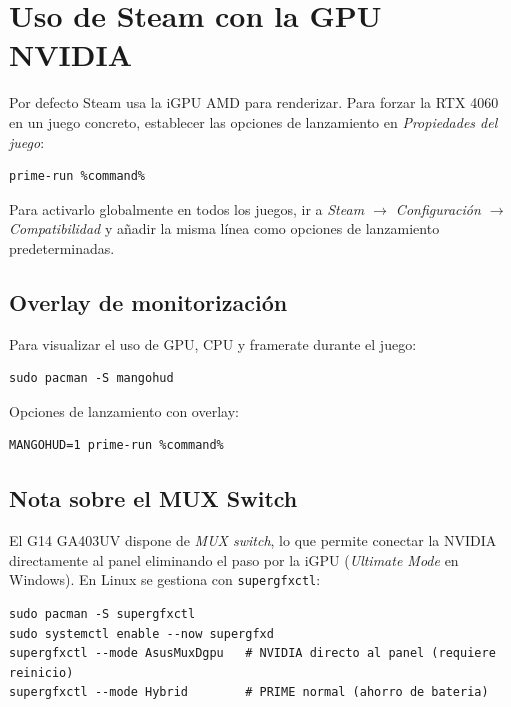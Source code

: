 \documentclass[12pt,a4paper]{article}
\begin{document}
\section{Uso de Steam con la GPU NVIDIA}

Por defecto Steam usa la iGPU AMD para renderizar. Para forzar la RTX 4060
en un juego concreto, establecer las opciones de lanzamiento en
\emph{Propiedades del juego}:

\begin{lstlisting}[style=bash]
prime-run %command%
\end{lstlisting}

Para activarlo globalmente en todos los juegos, ir a
\textit{Steam $\to$ Configuración $\to$ Compatibilidad} y añadir la misma
línea como opciones de lanzamiento predeterminadas.

\subsection{Overlay de monitorización}

Para visualizar el uso de GPU, CPU y framerate durante el juego:

\begin{lstlisting}[style=bash]
sudo pacman -S mangohud
\end{lstlisting}

Opciones de lanzamiento con overlay:

\begin{lstlisting}[style=bash]
MANGOHUD=1 prime-run %command%
\end{lstlisting}

\subsection{Nota sobre el MUX Switch}

El G14 GA403UV dispone de \emph{MUX switch}, lo que permite conectar la
NVIDIA directamente al panel eliminando el paso por la iGPU
(\emph{Ultimate Mode} en Windows). En Linux se gestiona con
\texttt{supergfxctl}:

\begin{lstlisting}[style=bash]
sudo pacman -S supergfxctl
sudo systemctl enable --now supergfxd
supergfxctl --mode AsusMuxDgpu   # NVIDIA directo al panel (requiere reinicio)
supergfxctl --mode Hybrid        # PRIME normal (ahorro de bateria)
\end{lstlisting}
\end{document}
